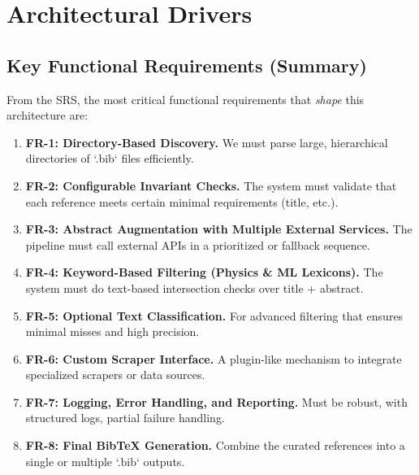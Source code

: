 \documentclass[12pt]{article}
\begin{document}
\section{Architectural Drivers}

\subsection{Key Functional Requirements (Summary)}
From the SRS, the most critical functional requirements that \emph{shape} this architecture are:
\begin{enumerate}[label=FR-\arabic*]
  \item \textbf{FR-1: Directory-Based Discovery.} We must parse large, hierarchical directories of `.bib` files efficiently.
  \item \textbf{FR-2: Configurable Invariant Checks.} The system must validate that each reference meets certain minimal requirements (title, etc.).
  \item \textbf{FR-3: Abstract Augmentation with Multiple External Services.} The pipeline must call external APIs in a prioritized or fallback sequence.
  \item \textbf{FR-4: Keyword-Based Filtering (Physics \& ML Lexicons).} The system must do text-based intersection checks over title + abstract.
  \item \textbf{FR-5: Optional Text Classification.} For advanced filtering that ensures minimal misses and high precision.
  \item \textbf{FR-6: Custom Scraper Interface.} A plugin-like mechanism to integrate specialized scrapers or data sources.
  \item \textbf{FR-7: Logging, Error Handling, and Reporting.} Must be robust, with structured logs, partial failure handling.
  \item \textbf{FR-8: Final BibTeX Generation.} Combine the curated references into a single or multiple `.bib` outputs.
\end{enumerate}
\end{document}

